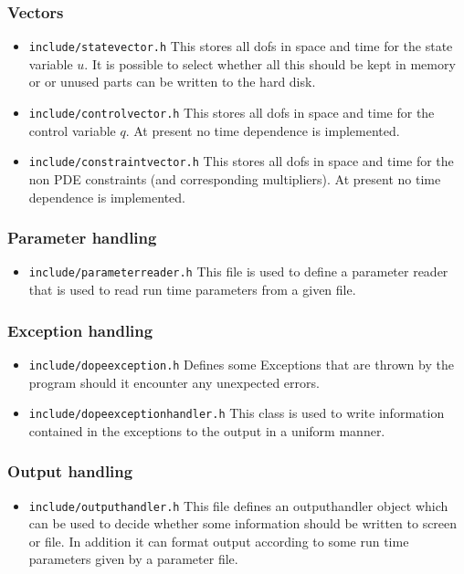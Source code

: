 \subsubsection{Vectors}
\begin{itemize}
\item \texttt{include/statevector.h} This stores all dofs in space and time for the state 
  variable $u$. It is possible to select whether all this should be kept in memory or 
  or unused parts can be written to the hard disk.
\item \texttt{include/controlvector.h} This stores all dofs in space and time for the 
  control variable $q$. At present no time dependence is implemented.
\item \texttt{include/constraintvector.h} This stores all dofs in space and time for the 
  non PDE constraints (and corresponding multipliers). 
  At present no time dependence is implemented.
\end{itemize}

\subsubsection{Parameter handling}
\begin{itemize}
\item \texttt{include/parameterreader.h} This file is used to define a parameter reader
  that is used to read run time parameters from a given file.
\end{itemize}

\subsubsection{Exception handling}
\begin{itemize}
\item \texttt{include/dopeexception.h} Defines some Exceptions that are thrown by the program
  should it encounter any unexpected errors.
\item \texttt{include/dopeexceptionhandler.h} This class is used to write information 
  contained in the exceptions to the output in a uniform manner.
\end{itemize}

\subsubsection{Output handling}
\begin{itemize}
\item \texttt{include/outputhandler.h} This file defines an outputhandler object which 
  can be used to decide whether some information should be written to screen or file.
  In addition it can format output according to some run time parameters given by a 
  parameter file.
\end{itemize}

